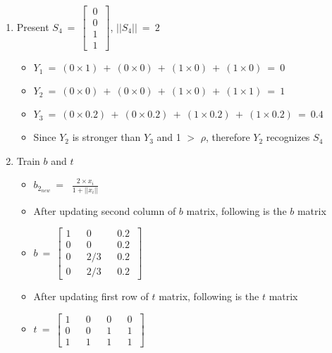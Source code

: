 \documentclass[12pt]{article}
\begin{document}
\begin{enumerate}
	\item Present $S_4 \ = \ \begin{bmatrix}
		\ 0 \  \\ \ 0 \ \\  \ 1 \  \\  \ 1 \   
	\end{bmatrix}$, $|| S_4 || \ = \ 2 $

	\begin{itemize}
		\item $Y_1 \ = \ (0 \times 1) \ + \ (0 \times 0) \ + \ (1 \times 0) \ + \ (1 \times 0)  \ = \ 0$
		\item $Y_2 \ = \ (0 \times 0) \ + \ (0 \times 0) \ + \ (1 \times 0) \ + \ (1 \times 1)  \ = \ 1$
		\item $Y_3 \ = \ (0 \times 0.2) \ + \ (0 \times 0.2) \ + \ (1 \times 0.2) \ + \ (1 \times 0.2)  \ = \ 0.4$
		\item Since $Y_2$ is stronger than $Y_3$ and 1 $>$ $\rho$, therefore $Y_2$ recognizes $S_4$
	\end{itemize}
	
	\item Train $b$ and $t$
	
	\begin{itemize}
		\item $b_{2_{new}} \ = \ $  $\frac{2 \times x_i}{1 + || x_i ||}$
		
		\item After updating second column of $b$ matrix, following is the $b$ matrix
		
		\item $ b \ = \ \begin{bmatrix}
			1 && 0 && 0.2 \ \\
			0 && 0 && 0.2 \ \\
			0 && 2/3 && 0.2 \ \\
			0 && 2/3 && 0.2 \
		\end{bmatrix}$
		
		\item After updating first row of $t$ matrix, following is the $t$ matrix
		
		\item $ t  \ = \ \begin{bmatrix} 1 && 0 && 0 && 0 \\ 0 && 0 && 1 && 1 \\ 1 && 1 && 1 && 1 \ \end{bmatrix}$ 
		
	\end{itemize}
	
\end{enumerate}
\end{document}
